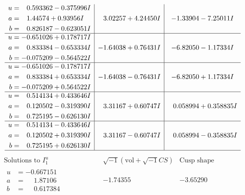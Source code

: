 \documentclass[1p]{elsarticle_modified}
\theoremstyle{definition}
\newcommand{\I}{\sqrt{-1}}
\begin{document}
$$\begin{array}{c|c|c}
\begin{aligned}
u &= \phantom{-}0.593362 - 0.375996 I \\
a &= \phantom{-}1.44574 + 0.93956 I \\
b &= \phantom{-}0.826187 - 0.623051 I\end{aligned}
 & \phantom{-}3.02257 + 4.24450 I & -1.33904 - 7.25011 I \\ \hline\begin{aligned}
u &= -0.651026 + 0.178717 I \\
a &= \phantom{-}0.833384 - 0.653334 I \\
b &= -0.075209 - 0.564522 I\end{aligned}
 & -1.64038 + 0.76431 I & -6.82050 - 1.17334 I \\ \hline\begin{aligned}
u &= -0.651026 - 0.178717 I \\
a &= \phantom{-}0.833384 + 0.653334 I \\
b &= -0.075209 + 0.564522 I\end{aligned}
 & -1.64038 - 0.76431 I & -6.82050 + 1.17334 I \\ \hline\begin{aligned}
u &= \phantom{-}0.514134 + 0.433646 I \\
a &= \phantom{-}0.120502 - 0.319390 I \\
b &= \phantom{-}0.725195 - 0.626130 I\end{aligned}
 & \phantom{-}3.31167 + 0.60747 I & \phantom{-}0.058994 + 0.358835 I \\ \hline\begin{aligned}
u &= \phantom{-}0.514134 - 0.433646 I \\
a &= \phantom{-}0.120502 + 0.319390 I \\
b &= \phantom{-}0.725195 + 0.626130 I\end{aligned}
 & \phantom{-}3.31167 - 0.60747 I & \phantom{-}0.058994 - 0.358835 I\\
 \hline 
 \end{array}$$\newpage$$\begin{array}{c|c|c}  
\text{Solutions to }I^u_{1}& \I (\text{vol} + \sqrt{-1}CS) & \text{Cusp shape}\\
 \hline 
\begin{aligned}
u &= -0.667151\phantom{ +0.000000I} \\
a &= \phantom{-}1.87106\phantom{ +0.000000I} \\
b &= \phantom{-}0.617384\phantom{ +0.000000I}\end{aligned}
 & -1.74355\phantom{ +0.000000I} & -3.65290\phantom{ +0.000000I} \\ \hline\begin{aligned}

\end{aligned}
\end{array}$$
\end{document}
